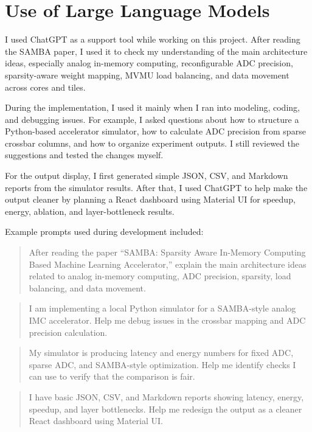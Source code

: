 \documentclass[11pt]{article}
\begin{document}
\section{Use of Large Language Models}

I used ChatGPT as a support tool while working on this project. After reading the SAMBA paper, I used it to check my understanding of the main architecture ideas, especially analog in-memory computing, reconfigurable ADC precision, sparsity-aware weight mapping, MVMU load balancing, and data movement across cores and tiles.

During the implementation, I used it mainly when I ran into modeling, coding, and debugging issues. For example, I asked questions about how to structure a Python-based accelerator simulator, how to calculate ADC precision from sparse crossbar columns, and how to organize experiment outputs. I still reviewed the suggestions and tested the changes myself.

For the output display, I first generated simple JSON, CSV, and Markdown reports from the simulator results. After that, I used ChatGPT to help make the output cleaner by planning a React dashboard using Material UI for speedup, energy, ablation, and layer-bottleneck results.

Example prompts used during development included:

\begin{quote}
After reading the paper ``SAMBA: Sparsity Aware In-Memory Computing Based Machine Learning Accelerator,'' explain the main architecture ideas related to analog in-memory computing, ADC precision, sparsity, load balancing, and data movement.
\end{quote}

\begin{quote}
I am implementing a local Python simulator for a SAMBA-style analog IMC accelerator. Help me debug issues in the crossbar mapping and ADC precision calculation.
\end{quote}

\begin{quote}
My simulator is producing latency and energy numbers for fixed ADC, sparse ADC, and SAMBA-style optimization. Help me identify checks I can use to verify that the comparison is fair.
\end{quote}

\begin{quote}
I have basic JSON, CSV, and Markdown reports showing latency, energy, speedup, and layer bottlenecks. Help me redesign the output as a cleaner React dashboard using Material UI.
\end{quote}
\end{document}
